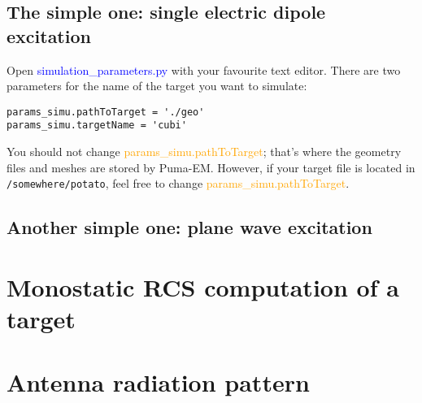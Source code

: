 \documentclass[a4paper,10pt]{book}
\newcommand{\file}[1] {\textcolor{blue}{\textsf{#1}}}
\newcommand{\parameter}[1] {\textcolor{orange}{\textsf{#1}}}
\begin{document}
\subsection{The simple one: single electric dipole excitation}
%
\par
Open \file{simulation\_parameters.py} with your favourite text editor. There are two parameters for the name of the target you want to simulate:
\begin{verbatim}
params_simu.pathToTarget = './geo'
params_simu.targetName = 'cubi'
\end{verbatim}
You should not change \parameter{params\_simu.pathToTarget}; that's where the geometry files and meshes are stored by Puma-EM. However, if your target file is located in \texttt{/somewhere/potato}, feel free to change \parameter{params\_simu.pathToTarget}.


\subsection{Another simple one: plane wave excitation}
%
\par



\section{Monostatic RCS computation of a target}
%
\par

\section{Antenna radiation pattern}
%
\par
\end{document}
